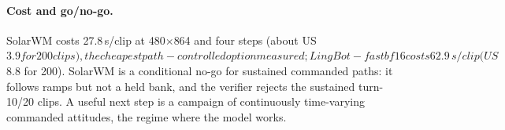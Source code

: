 \paragraph{Cost and go/no-go.}
SolarWM costs 27.8\,s/clip at 480$\times$864 and four steps (about US$3.9 for 200 clips), the
cheapest path-controlled option measured; LingBot-fast bf16 costs 62.9\,s/clip (US$8.8 for
200). SolarWM is a conditional no-go for sustained commanded paths: it follows ramps but not a
held bank, and the verifier rejects the sustained turn-10/20 clips. A useful next step is a
campaign of continuously time-varying commanded attitudes, the regime where the model works.

